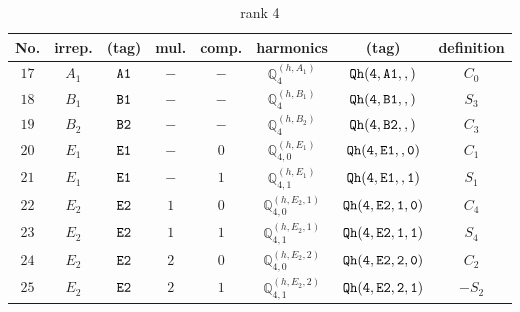 \documentclass[fleqn,8pt]{jsarticle}
\begin{document}
\begin{table}[ht!]
\begin{center}
\caption{rank 4}
\renewcommand{\arraystretch}{1.3}
\begin{tabular}{cccccccc} \hline \hline
No. & irrep. & (tag) & mul. & comp. & harmonics & (tag) & definition \\ \hline
$ 17 $ & $ A_{1} $ & $ {\tt A1} $ & $ - $ & $ - $ & $ \mathbb{Q}_{4}^{(h,A_{1})} $ & $ {\tt Qh(4,A1,,)} $ & $ C_{0} $ \\
$ 18 $ & $ B_{1} $ & $ {\tt B1} $ & $ - $ & $ - $ & $ \mathbb{Q}_{4}^{(h,B_{1})} $ & $ {\tt Qh(4,B1,,)} $ & $ S_{3} $ \\
$ 19 $ & $ B_{2} $ & $ {\tt B2} $ & $ - $ & $ - $ & $ \mathbb{Q}_{4}^{(h,B_{2})} $ & $ {\tt Qh(4,B2,,)} $ & $ C_{3} $ \\
$ 20 $ & $ E_{1} $ & $ {\tt E1} $ & $ - $ & $ 0 $ & $ \mathbb{Q}_{4,0}^{(h,E_{1})} $ & $ {\tt Qh(4,E1,,0)} $ & $ C_{1} $ \\
$ 21 $ & $ E_{1} $ & $ {\tt E1} $ & $ - $ & $ 1 $ & $ \mathbb{Q}_{4,1}^{(h,E_{1})} $ & $ {\tt Qh(4,E1,,1)} $ & $ S_{1} $ \\
$ 22 $ & $ E_{2} $ & $ {\tt E2} $ & $ 1 $ & $ 0 $ & $ \mathbb{Q}_{4,0}^{(h,E_{2},1)} $ & $ {\tt Qh(4,E2,1,0)} $ & $ C_{4} $ \\
$ 23 $ & $ E_{2} $ & $ {\tt E2} $ & $ 1 $ & $ 1 $ & $ \mathbb{Q}_{4,1}^{(h,E_{2},1)} $ & $ {\tt Qh(4,E2,1,1)} $ & $ S_{4} $ \\
$ 24 $ & $ E_{2} $ & $ {\tt E2} $ & $ 2 $ & $ 0 $ & $ \mathbb{Q}_{4,0}^{(h,E_{2},2)} $ & $ {\tt Qh(4,E2,2,0)} $ & $ C_{2} $ \\
$ 25 $ & $ E_{2} $ & $ {\tt E2} $ & $ 2 $ & $ 1 $ & $ \mathbb{Q}_{4,1}^{(h,E_{2},2)} $ & $ {\tt Qh(4,E2,2,1)} $ & $ - S_{2} $ \\
 \hline \hline
\end{tabular}
\end{center}
\end{table}
\end{document}
